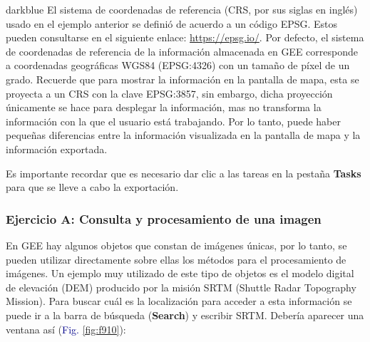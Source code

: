 \documentclass[
  12pt,
  letterpaper,
  twoside]{book}
\begin{document}
\begin{bluebox2}

\begin{awesomeblock}{5pt}{\faLightbulb}{darkblue}
El sistema de coordenadas de referencia (CRS, por sus siglas en inglés) usado en el ejemplo anterior se definió de acuerdo a un código EPSG. Estos pueden consultarse en el siguiente enlace: \url{https://epsg.io/}. Por defecto, el sistema de coordenadas de referencia de la información almacenada en GEE corresponde a coordenadas geográficas WGS84 (EPSG:4326) con un tamaño de píxel de un grado. Recuerde que para mostrar la información en la pantalla de mapa, esta se proyecta a un CRS con la clave EPSG:3857, sin embargo, dicha proyección únicamente se hace para desplegar la información, mas no transforma la información con la que el usuario está trabajando. Por lo tanto, puede haber pequeñas diferencias entre la información visualizada en la pantalla de mapa y la información exportada.

\end{awesomeblock}

\end{bluebox2}

Es importante recordar que es necesario dar clic a las tareas en la pestaña \textbf{Tasks} para que se lleve a cabo la exportación.

\hypertarget{ejercicio-a-consulta-y-procesamiento-de-una-imagen}{%
\subsubsection*{Ejercicio A: Consulta y procesamiento de una imagen}\label{ejercicio-a-consulta-y-procesamiento-de-una-imagen}}

En GEE hay algunos objetos que constan de imágenes únicas, por lo tanto, se pueden utilizar directamente sobre ellas los métodos para el procesamiento de imágenes. Un ejemplo muy utilizado de este tipo de objetos es el modelo digital de elevación (DEM) producido por la misión SRTM (Shuttle Radar Topography Mission). Para buscar cuál es la localización para acceder a esta información se puede ir a la barra de búsqueda (\textbf{Search}) y escribir SRTM. Debería aparecer una ventana así (\textcolor{darkblue}{Fig.} \ref{fig:f910}):
\end{document}
